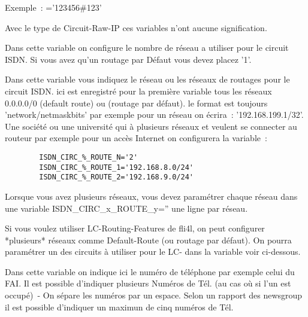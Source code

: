 \begin{description}
  Exemple~: ='123456\#123'

  Avec le type de Circuit-Raw-IP ces variables n'ont aucune signification.


  Dans cette variable on configure le nombre de réseau a utiliser pour le
  circuit ISDN. Si vous avez qu'un routage par Défaut vous devez placez '1'.


  Dans cette variable vous indiquez le réseau ou les réseaux de routages pour
  le circuit ISDN. ici est enregistré pour la première variable tous les réseaux
  0.0.0.0/0 (default route) ou (routage par défaut). le format est toujours
  'network/netmaskbits' par exemple pour un réseau on écrira~: '192.168.199.1/32'.
  Une société ou une université qui à plusieurs réseaux et veulent se connecter
  au routeur par exemple pour un accès Internet on configurera la variable~:

\begin{example}
\begin{verbatim}
        ISDN_CIRC_%_ROUTE_N='2'
        ISDN_CIRC_%_ROUTE_1='192.168.8.0/24'
        ISDN_CIRC_%_ROUTE_2='192.168.9.0/24'
\end{verbatim}
\end{example}

  Lorsque vous avez plusieurs réseaux, vous devez paramétrer chaque réseau dans
  une variable ISDN\_CIRC\_x\_ROUTE\_y='' une ligne par réseau.

  Si vous voulez utiliser LC-Routing-Features de fli4l, on peut configurer
  *plusieurs* réseaux comme Default-Route (ou routage par défaut). On pourra
  paramétrer un des circuits à utiliser pour le LC- dans la variable 
   voir ci-dessous.


  Dans cette variable  on indique ici le numéro
  de téléphone par exemple celui du FAI. Il est possible d'indiquer plusieurs
  Numéros de Tél. (au cas où si l'un est occupé)~- On sépare les numéros par un
  espace. Selon un rapport des newsgroup il est possible d'indiquer un maximun
  de cinq numéros de Tél.



\end{description}
